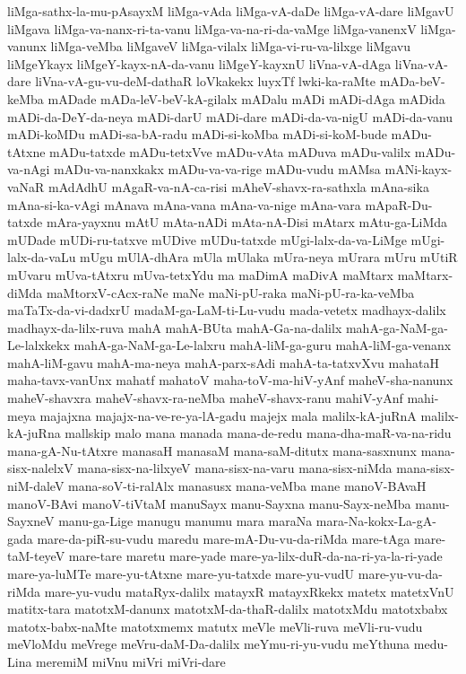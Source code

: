 {liMga-sathx-la-mu-pAsayxM
liMga-vAda
liMga-vA-daDe
liMga-vA-dare
liMgavU
liMgava
liMga-va-nanx-ri-ta-vanu
liMga-va-na-ri-da-vaMge
liMga-vanenxV
liMga-vanunx
liMga-veMba
liMgaveV
liMga-vilalx
liMga-vi-ru-va-lilxge
liMgavu
liMgeYkayx
liMgeY-kayx-nA-da-vanu
liMgeY-kayxnU
liVna-vA-dAga
liVna-vA-dare
liVna-vA-gu-vu-deM-dathaR
loVkakekx
luyxTf
lwki-ka-raMte
mADa-beV-keMba
mADade
mADa-leV-beV-kA-gilalx
mADalu
mADi
mADi-dAga
mADida
mADi-da-DeY-da-neya
mADi-darU
mADi-dare
mADi-da-va-nigU
mADi-da-vanu
mADi-koMDu
mADi-sa-bA-radu
mADi-si-koMba
mADi-si-koM-bude
mADu-tAtxne
mADu-tatxde
mADu-tetxVve
mADu-vAta
mADuva
mADu-valilx
mADu-va-nAgi
mADu-va-nanxkakx
mADu-va-va-rige
mADu-vudu
mAMsa
mANi-kayx-vaNaR
mAdAdhU
mAgaR-va-nA-ca-risi
mAheV-shavx-ra-sathxla
mAna-sika
mAna-si-ka-vAgi
mAnava
mAna-vana
mAna-va-nige
mAna-vara
mApaR-Du-tatxde
mAra-yayxnu
mAtU
mAta-nADi
mAta-nA-Disi
mAtarx
mAtu-ga-LiMda
mUDade
mUDi-ru-tatxve
mUDive
mUDu-tatxde
mUgi-lalx-da-va-LiMge
mUgi-lalx-da-vaLu
mUgu
mUlA-dhAra
mUla
mUlaka
mUra-neya
mUrara
mUru
mUtiR
mUvaru
mUva-tAtxru
mUva-tetxYdu
ma
maDimA
maDivA
maMtarx
maMtarx-diMda
maMtorxV-cAcx-raNe
maNe
maNi-pU-raka
maNi-pU-ra-ka-veMba
maTaTx-da-vi-dadxrU
madaM-ga-LaM-ti-Lu-vudu
mada-vetetx
madhayx-dalilx
madhayx-da-lilx-ruva
mahA
mahA-BUta
mahA-Ga-na-dalilx
mahA-ga-NaM-ga-Le-lalxkekx
mahA-ga-NaM-ga-Le-lalxru
mahA-liM-ga-guru
mahA-liM-ga-venanx
mahA-liM-gavu
mahA-ma-neya
mahA-parx-sAdi
mahA-ta-tatxvXvu
mahataH
maha-tavx-vanUnx
mahatf
mahatoV
maha-toV-ma-hiV-yAnf
maheV-sha-nanunx
maheV-shavxra
maheV-shavx-ra-neMba
maheV-shavx-ranu
mahiV-yAnf
mahi-meya
majajxna
majajx-na-ve-re-ya-lA-gadu
majejx
mala
malilx-kA-juRnA
malilx-kA-juRna
mallskip
malo
mana
manada
mana-de-redu
mana-dha-maR-va-na-ridu
mana-gA-Nu-tAtxre
manasaH
manasaM
mana-saM-ditutx
mana-sasxnunx
mana-sisx-nalelxV
mana-sisx-na-lilxyeV
mana-sisx-na-varu
mana-sisx-niMda
mana-sisx-niM-daleV
mana-soV-ti-ralAlx
manasusx
mana-veMba
mane
manoV-BAvaH
manoV-BAvi
manoV-tiVtaM
manuSayx
manu-Sayxna
manu-Sayx-neMba
manu-SayxneV
manu-ga-Lige
manugu
manumu
mara
maraNa
mara-Na-kokx-La-gA-gada
mare-da-piR-su-vudu
maredu
mare-mA-Du-vu-da-riMda
mare-tAga
mare-taM-teyeV
mare-tare
maretu
mare-yade
mare-ya-lilx-duR-da-na-ri-ya-la-ri-yade
mare-ya-luMTe
mare-yu-tAtxne
mare-yu-tatxde
mare-yu-vudU
mare-yu-vu-da-riMda
mare-yu-vudu
mataRyx-dalilx
matayxR
matayxRkekx
matetx
matetxVnU
matitx-tara
matotxM-danunx
matotxM-da-thaR-dalilx
matotxMdu
matotxbabx
matotx-babx-naMte
matotxmemx
matutx
meVle
meVli-ruva
meVli-ru-vudu
meVloMdu
meVrege
meVru-daM-Da-dalilx
meYmu-ri-yu-vudu
meYthuna
medu-Lina
meremiM
miVnu
miVri
miVri-dare
}
